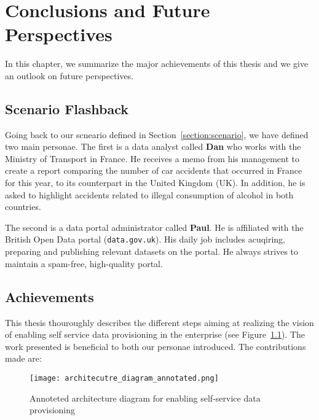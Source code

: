 \chapter{Conclusions and Future Perspectives}  \label{ch:conclusion}
\graphicspath{{conclusions/figures/}}

In this chapter, we summarize the major achievements of this thesis and we give an outlook on future perspectives.

\section{Scenario Flashback}

Going back to our scneario defined in Section~\ref{section:scenario}, we have defined two main personae. The first is a data analyst called \textbf{Dan} who works with the Ministry of Transport in France. He receives a memo from his management to create a report comparing the number of car accidents that occurred in France for this year, to its counterpart in the United Kingdom (UK). In addition, he is asked to highlight accidents related to illegal consumption of alcohol in both countries.

The second is a data portal administrator called \textbf{Paul}. He is affiliated with the British Open Data portal (\texttt{data.gov.uk}). His daily job includes acuqiring, preparing and publishing relevant datasets on the portal. He always strives to maintain a spam-free, high-quality portal.

\section{Achievements}

This thesis thouroughly describes the different steps aiming at realizing the vision of enabling self service data provisioning in the enterprise (see Figure~\ref{fig:architecutre_diagram_annotated}). The work presented is beneficial to both our personae introduced. The contributions made are:

\begin{adjustwidth}{-.4in}{-.4in}
	\begin{figure}[!ht]
	  \centering
	  \texttt{[image: architecutre\_diagram\_annotated.png]}
	  \caption{Annoteted architecture diagram for enabling self-service data provisioning}
	  \label{fig:architecutre_diagram_annotated}
	\end{figure}
\end{adjustwidth}

